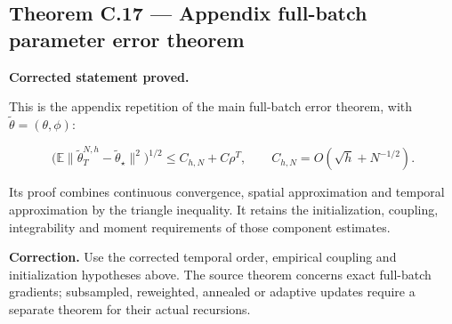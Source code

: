 \documentclass[11pt,a4paper]{report}
\begin{document}
\subsection{\texorpdfstring{Theorem C.17 — Appendix full-batch parameter error theorem}{Theorem C.17 — Appendix full-batch parameter error theorem}}


\textbf{Corrected statement proved.}



This is the appendix repetition of the main
        full-batch error theorem, with \(\widetilde\theta=(\theta,\phi)\):


        \[\bigl(\mathbb E\|\widetilde\theta_T^{N,h}
                    -\widetilde\theta_\star\|^2\bigr)^{1/2}
          \le C_{h,N}+C\rho^T,\qquad
          C_{h,N}=O(\sqrt h+N^{-1/2}).\]


Its proof combines continuous convergence, spatial approximation and
        temporal approximation by the triangle inequality. It retains the
        initialization, coupling, integrability and moment requirements of those
        component estimates.



\textbf{Correction.} Use the corrected temporal order, empirical coupling and initialization hypotheses above. The source theorem concerns exact full-batch gradients; subsampled, reweighted, annealed or adaptive updates require a separate theorem for their actual recursions.
\end{document}
